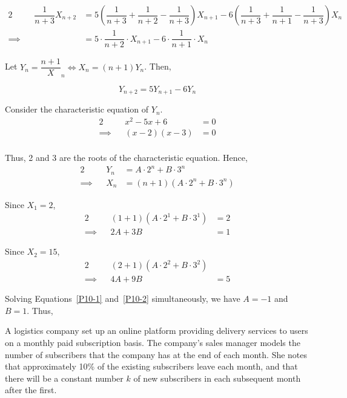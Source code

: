 \documentclass{jhwhw}
\begin{document}
        \begin{alignat*}{2}
            &&\dfrac1{n+3}X_{n+2} &= 5\left(\dfrac1{n+3} + \dfrac1{n+2} - \dfrac1{n+3}\right)X_{n+1} - 6\left(\dfrac1{n+3} + \dfrac1{n+1} - \dfrac1{n+3}\right)X_n\\
            \implies&& &= 5\cdot \dfrac1{n+2} \cdot X_{n+1} - 6\cdot \dfrac1{n+1} \cdot X_n
        \end{alignat*}

        Let $Y_n = \dfrac{n + 1}X_n \iff X_n = (n+1)Y_n$. Then,

        \begin{equation*}
            Y_{n+2} = 5 Y_{n+1} - 6Y_n
        \end{equation*}

        Consider the characteristic equation of $Y_n$.
        \begin{alignat*}{2}
            &&x^2 - 5x + 6 &= 0\\
            \implies&&(x-2)(x-3) &= 0\\
        \end{alignat*}

        Thus, 2 and 3 are the roots of the characteristic equation. Hence,
        \begin{alignat*}{2}
            &&Y_n &= A \cdot 2^n + B \cdot 3^n\\
            \implies&&X_n &= (n+1)\left(A \cdot 2^n + B \cdot 3^n\right)
        \end{alignat*}

        Since $X_1 = 2$,
        \begin{alignat}{2}
            &&(1+1)\left(A \cdot 2^1 + B \cdot 3^1\right) &= 2\nonumber\\
            \implies&&2A + 3B &= 1\label{P10-1}
        \end{alignat}

        Since $X_2 = 15$,
        \begin{alignat}{2}
            &&(2+1)\left(A \cdot 2^2 + B \cdot 3^2\right)\nonumber\\
            \implies&&4A + 9B &= 5\label{P10-2}
        \end{alignat}

        Solving Equations~\ref{P10-1} and~\ref{P10-2} simultaneously, we have $A = -1$ and $B = 1$. Thus,


    \problem{}
        A logistics company set up an online platform providing delivery services to users on a monthly paid subscription basis. The company's sales manager models the number of subscribers that the company has at the end of each month. She notes that approximately 10\% of the existing subscribers leave each month, and that there will be a constant number $k$ of new subscribers in each subsequent month after the first.
\end{document}
